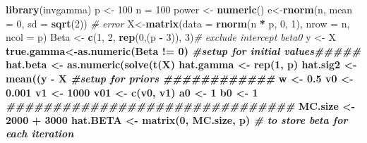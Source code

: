 \documentclass[]{book}
\newenvironment{Shaded}{\begin{snugshade}}{\end{snugshade}}
\newcommand{\CommentTok}[1]{\textcolor[rgb]{0.56,0.35,0.01}{\textit{#1}}}
\newcommand{\DataTypeTok}[1]{\textcolor[rgb]{0.13,0.29,0.53}{#1}}
\newcommand{\DecValTok}[1]{\textcolor[rgb]{0.00,0.00,0.81}{#1}}
\newcommand{\FloatTok}[1]{\textcolor[rgb]{0.00,0.00,0.81}{#1}}
\newcommand{\KeywordTok}[1]{\textcolor[rgb]{0.13,0.29,0.53}{\textbf{#1}}}
\newcommand{\NormalTok}[1]{#1}
\newcommand{\OperatorTok}[1]{\textcolor[rgb]{0.81,0.36,0.00}{\textbf{#1}}}
\newcommand{\StringTok}[1]{\textcolor[rgb]{0.31,0.60,0.02}{#1}}
\begin{document}
\begin{Shaded}
\begin{Highlighting}[]
\KeywordTok{library}\NormalTok{(invgamma)}
\NormalTok{p <-}\StringTok{ }\DecValTok{100}
\NormalTok{n =}\StringTok{ }\DecValTok{100}
\NormalTok{power <-}\StringTok{ }\KeywordTok{numeric}\NormalTok{()}
\NormalTok{e<-}\KeywordTok{rnorm}\NormalTok{(n, }\DataTypeTok{mean =} \DecValTok{0}\NormalTok{, }\DataTypeTok{sd =} \KeywordTok{sqrt}\NormalTok{(}\DecValTok{2}\NormalTok{)) }\CommentTok{# error}
\NormalTok{X<-}\KeywordTok{matrix}\NormalTok{(}\DataTypeTok{data =} \KeywordTok{rnorm}\NormalTok{(n }\OperatorTok{*}\StringTok{ }\NormalTok{p, }\DecValTok{0}\NormalTok{, }\DecValTok{1}\NormalTok{), }\DataTypeTok{nrow =}\NormalTok{ n, }\DataTypeTok{ncol =}\NormalTok{ p)}
\NormalTok{Beta <-}\StringTok{ }\KeywordTok{c}\NormalTok{(}\DecValTok{1}\NormalTok{, }\DecValTok{2}\NormalTok{, }\KeywordTok{rep}\NormalTok{(}\DecValTok{0}\NormalTok{,(p }\OperatorTok{-}\StringTok{ }\DecValTok{3}\NormalTok{)), }\DecValTok{3}\NormalTok{)}\CommentTok{# exclude intercept beta0}
\NormalTok{y <-}\StringTok{ }\NormalTok{X }\OperatorTok{%*%}\StringTok{ }\NormalTok{Beta }\OperatorTok{+}\StringTok{ }\NormalTok{e }\CommentTok{# true model}
\NormalTok{true.gamma<-}\KeywordTok{as.numeric}\NormalTok{(Beta }\OperatorTok{!=}\StringTok{ }\DecValTok{0}\NormalTok{)}
\CommentTok{#setup for initial values#####}
\NormalTok{hat.beta <-}\StringTok{ }\KeywordTok{as.numeric}\NormalTok{(}\KeywordTok{solve}\NormalTok{(}\KeywordTok{t}\NormalTok{(X) }\OperatorTok{%*%}\StringTok{ }\NormalTok{(X) }\OperatorTok{+}\StringTok{ }\KeywordTok{diag}\NormalTok{(}\DecValTok{1}\NormalTok{, p)) }\OperatorTok{%*%}\StringTok{ }\KeywordTok{t}\NormalTok{(X) }\OperatorTok{%*%}\StringTok{ }\NormalTok{y) }\CommentTok{#p-dim vector}
\NormalTok{hat.gamma <-}\StringTok{ }\KeywordTok{rep}\NormalTok{(}\DecValTok{1}\NormalTok{, p)}
\NormalTok{hat.sig2 <-}\StringTok{ }\KeywordTok{mean}\NormalTok{((y }\OperatorTok{-}\StringTok{ }\NormalTok{X }\OperatorTok{%*%}\StringTok{ }\NormalTok{hat.beta)}\OperatorTok{^}\DecValTok{2}\NormalTok{)}
\CommentTok{#setup for priors ############}
\NormalTok{w <-}\StringTok{ }\FloatTok{0.5}
\NormalTok{v0 <-}\StringTok{ }\FloatTok{0.001}
\NormalTok{v1 <-}\StringTok{ }\DecValTok{1000}
\NormalTok{v01 <-}\StringTok{ }\KeywordTok{c}\NormalTok{(v0, v1)}
\NormalTok{a0 <-}\StringTok{ }\DecValTok{1}
\NormalTok{b0 <-}\StringTok{ }\DecValTok{1}
\CommentTok{###############################}
\NormalTok{MC.size <-}\StringTok{ }\DecValTok{2000} \OperatorTok{+}\StringTok{ }\DecValTok{3000}
\NormalTok{hat.BETA <-}\StringTok{ }\KeywordTok{matrix}\NormalTok{(}\DecValTok{0}\NormalTok{, MC.size, p) }\CommentTok{# to store beta for each iteration}
}}}
\end{Highlighting}
\end{Shaded}
\end{document}
